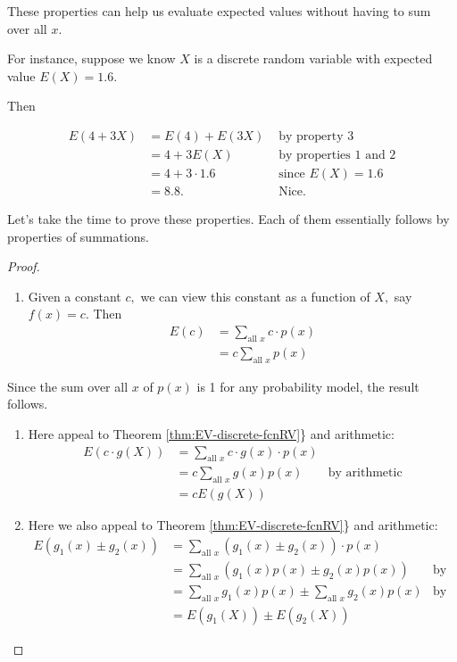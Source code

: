 \documentclass[
]{book}
\providecommand{\tightlist}{%
  \setlength{\itemsep}{0pt}\setlength{\parskip}{0pt}}
\theoremstyle{definition}
\theoremstyle{definition}
\theoremstyle{definition}
\theoremstyle{definition}
\theoremstyle{remark}
\begin{document}
These properties can help us evaluate expected values without having to sum over all \(x\).

For instance, suppose we know \(X\) is a discrete random variable with expected value \(E(X) = 1.6\).

Then

\begin{align*}
E(4+3X) &= E(4) + E(3X) &\text{ by property 3} \\
        &= 4 + 3E(X) &\text{ by properties 1 and 2}\\
        &= 4 + 3 \cdot 1.6 &\text { since }E(X) = 1.6 \\
        &= 8.8. &\text{ Nice.}
\end{align*}

Let's take the time to prove these properties. Each of them essentially follows by properties of summations.

\begin{proof}
\leavevmode

\begin{enumerate}
\def\labelenumi{\arabic{enumi}.}
\tightlist
\item
  Given a constant \(c,\) we can view this constant as a function of \(X,\) say \(f(x) = c\). Then
  \begin{align*}
  E(c) &= \sum_{\text{all }x} c \cdot p(x) \\
  &= c \sum_{\text{all }x} p(x)
  \end{align*}
\end{enumerate}

Since the sum over all \(x\) of \(p(x)\) is 1 for any probability model, the result follows.

\begin{enumerate}
\def\labelenumi{\arabic{enumi}.}
\setcounter{enumi}{1}
\item
  Here appeal to Theorem \ref{thm:EV-discrete-fcnRV}\} and arithmetic:
  \begin{align*}
  E(c\cdot g(X)) &= \sum_{\text{all }x} c \cdot g(x) \cdot p(x) & \\
  &= c \sum_{\text{all }x} g(x) p(x) &\text{by arithmetic}\\
  &= c E(g(X)) & 
  \end{align*}
\item
  Here we also appeal to Theorem \ref{thm:EV-discrete-fcnRV}\} and arithmetic:
  \begin{align*}
  E(g_1(x) \pm g_2(x)) &= \sum_{\text{all }x} (g_1(x) \pm g_2(x))\cdot p(x) &\\
  &= \sum_{\text{all }x} (g_1(x) p(x) \pm g_2(x) p(x)) &\text{by arithmetic}\\
  &= \sum_{\text{all }x} g_1(x) p(x) \pm \sum_{\text{all }x} g_2(x) p(x)  &\text{by arithmetic}\\
  &= E(g_1(X)) \pm E(g_2(X)) & 
  \end{align*}
\end{enumerate}

\end{proof}
\end{document}
